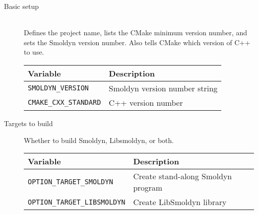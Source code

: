 \documentclass {book}
\begin{document}
\begin{description}

\item[Basic setup]
\hfill \\
Defines the project name, lists the CMake minimum version number, and sets the Smoldyn version number. Also tells CMake which version of C++ to use.\\
\begin{longtable}[c]{ll}
Variable & Description\\
\hline
\texttt{SMOLDYN\_VERSION} & Smoldyn version number string\\
\texttt{CMAKE\_CXX\_STANDARD} & C++ version number\\
\end{longtable}

\item[Targets to build]
Whether to build Smoldyn, Libsmoldyn, or both.
\begin{longtable}[c]{ll}
Variable & Description\\
\hline
\texttt{OPTION\_TARGET\_SMOLDYN} & Create stand-along Smoldyn program\\
\texttt{OPTION\_TARGET\_LIBSMOLDYN} & Create LibSmoldyn library\\
\end{longtable}


\end{description}
\end{document}

